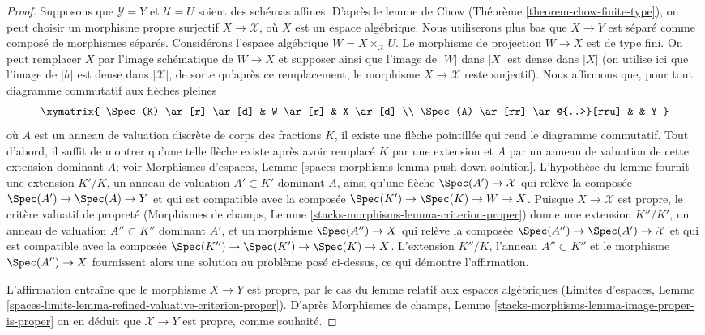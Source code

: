 \begin{proof}
\medskip\noindent
Supposons que $\mathcal{Y} = Y$ et $\mathcal{U} = U$ soient des schémas affines.
D'après le lemme de Chow (Théorème \ref{theorem-chow-finite-type}),
on peut choisir un morphisme propre surjectif $X \to \mathcal{X}$,
où $X$ est un espace algébrique. Nous utiliserons plus bas que $X \to Y$ est séparé
comme composé de morphismes séparés. Considérons
l'espace algébrique $W = X \times_\mathcal{X} U$. Le morphisme de projection
$W \to X$ est de type fini.
On peut remplacer $X$ par l'image schématique de
$W \to X$ et supposer ainsi que l'image de $|W|$ dans $|X|$
est dense dans $|X|$ (on utilise ici que l'image de $|h|$
est dense dans $|\mathcal{X}|$, de sorte qu'après ce remplacement, le
morphisme $X \to \mathcal{X}$ reste surjectif).
Nous affirmons que, pour tout diagramme commutatif aux flèches pleines
$$
\xymatrix{
\Spec(K) \ar[r] \ar[d] & W \ar[r] & X \ar[d] \\
\Spec(A) \ar[rr] \ar@{..>}[rru] & & Y
}
$$
où $A$ est un anneau de valuation discrète de corps des fractions $K$, il
existe une flèche pointillée qui rend le diagramme commutatif. Tout d'abord, il suffit de
montrer qu'une telle flèche existe après avoir remplacé $K$ par une extension
et $A$ par un anneau de valuation de cette extension dominant $A$; voir
Morphismes d'espaces, Lemme \ref{spaces-morphisms-lemma-push-down-solution}.
L'hypothèse du lemme fournit une extension $K'/K$, un anneau de
valuation $A' \subset K'$ dominant $A$, ainsi
qu'une flèche $\Spec(A') \to \mathcal{X}$ qui relève la composée
$\Spec(A') \to \Spec(A) \to Y$ et qui est compatible avec la composée
$\Spec(K') \to \Spec(K) \to W \to X$. Puisque $X \to \mathcal{X}$
est propre, le critère valuatif de propreté
(Morphismes de champs, Lemme \ref{stacks-morphisms-lemma-criterion-proper})
donne une extension $K''/K'$, un anneau de valuation $A'' \subset K''$
dominant $A'$, et un morphisme $\Spec(A'') \to X$ qui relève la composée
$\Spec(A'') \to \Spec(A') \to \mathcal{X}$ et qui est compatible avec la composée
$\Spec(K'') \to \Spec(K') \to \Spec(K) \to X$.
L'extension $K''/K$, l'anneau $A'' \subset K''$ et le morphisme $\Spec(A'') \to X$
fournissent alors une solution au problème posé ci-dessus, ce qui démontre l'affirmation.

\medskip\noindent
L'affirmation entraîne que le morphisme $X \to Y$ est propre, par le
cas du lemme relatif aux espaces algébriques
(Limites d'espaces, Lemme
\ref{spaces-limits-lemma-refined-valuative-criterion-proper}).
D'après Morphismes de champs, Lemme
\ref{stacks-morphisms-lemma-image-proper-is-proper}
on en déduit que $\mathcal{X} \to Y$ est propre, comme souhaité.
\end{proof}

